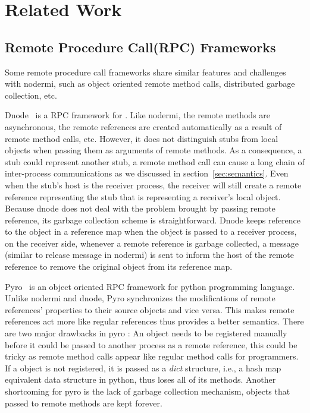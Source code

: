 \chapter{Related Work}

\section{Remote Procedure Call(RPC) Frameworks}
\label{sec:relatedrpc}
Some remote procedure call frameworks share similar features and challenges 
with nodermi, such as object oriented remote method calls,
distributed garbage collection, etc.

Dnode~\cite{dnode} is a RPC framework for \nodejs{}. 
Like nodermi, the remote methods are asynchronous, the remote references are created
automatically as a result of remote method calls, etc.
However, it does not distinguish stubs from local objects 
when passing them as arguments of remote methods.
As a consequence, a stub could represent another stub,
a remote method call can cause a long chain of inter-process communications as
we discussed in section~\ref{sec:semantics}.
Even when the stub's host is the receiver process,
the receiver will still create a remote reference
representing the stub that is representing a receiver's local object.
Because dnode does not deal with 
the problem brought by passing remote reference,
its garbage collection scheme is straightforward.
Dnode keeps reference to the object in a reference map when the object
 is passed to a receiver process,
on the receiver side,
whenever a remote reference is garbage collected, 
a  message (similar to release message in nodermi) 
is sent to inform the host of the remote reference
 to remove the original object from its reference map.

 
Pyro~\cite{pyro} is an object oriented RPC framework for python programming language.
Unlike nodermi and dnode,
Pyro synchronizes the modifications of remote references' properties to their source 
objects and vice versa.
This makes remote references act more like regular references thus
provides a better semantics.
There are two major drawbacks in pyro :
An object needs to be registered manually
before it could be passed to another process as a remote reference,
this could be tricky as remote method calls appear like regular method calls for 
programmers.
If a object is not registered,
it is passed as a \emph{dict} structure, i.e., 
a hash map equivalent data structure in python,
thus loses all of its methods.
Another shortcoming for pyro is the lack of garbage collection mechanism, 
objects that passed to remote methods are kept forever.


